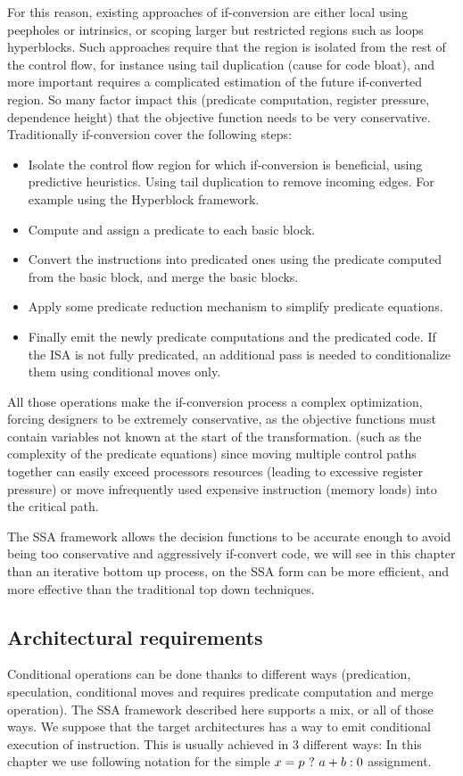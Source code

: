 For this reason, existing approaches of if-conversion are either local using peepholes or intrinsics, or scoping larger but restricted regions such as loops hyperblocks. Such approaches require that the region is isolated from the rest of the control flow, for instance using tail duplication (cause for code bloat), and more important requires a complicated estimation of the future if-converted region. So many factor impact this (predicate computation, register pressure, dependence height) that the objective function needs to be very conservative. Traditionally if-conversion cover the following steps:

\begin{itemize}
\item Isolate the control flow region for which if-conversion is beneficial, using predictive heuristics. Using tail duplication to remove incoming edges. For example using the Hyperblock framework.
\item Compute and assign a predicate to each basic block.
\item Convert the instructions into predicated ones using the predicate computed from the basic block, and merge the basic blocks.
\item Apply some predicate reduction mechanism to simplify predicate equations.
\item Finally emit the newly predicate computations and the predicated code. If the ISA is not fully predicated, an additional pass is needed to conditionalize them using conditional moves only.
\end{itemize}

All those operations make the if-conversion process a complex optimization, forcing designers to be extremely conservative, as the objective functions must contain variables not known at the start of the transformation. (such as the complexity of the predicate equations) since moving multiple control paths together can easily exceed processors resources (leading to excessive register pressure) or move infrequently used expensive instruction (memory loads) into the critical path. 

The SSA framework allows the decision functions to be accurate enough to avoid being too conservative and aggressively if-convert code, we will see in this chapter than an iterative bottom up process, on the SSA form can be more efficient, and more effective than the traditional top down techniques.

\subsection{Architectural requirements}
Conditional operations can be done thanks to different ways (predication, speculation, conditional moves and requires predicate computation and merge operation). The SSA framework described here supports a mix, or all of those ways. We suppose that the target architectures has a way to emit conditional execution of instruction. This is usually achieved in 3 different ways: In this chapter we use following notation for the simple $x = p ~?~ a + b : 0$ assignment.


